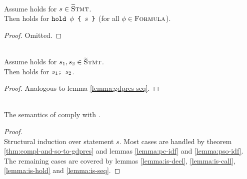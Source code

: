 \begin{lemma}
    \label{lemma:is-hold}~\\
    Assume  holds for $s \in \textup{\textsc{\ensuremath{\widetilde{\text{S}}}tmt}}$.\\
    Then  holds for $\textup{\texttt{hold $\phi$~\{ $s$ \}}}$ (for all $\phi \in \textup{\textsc{Formula}}$).
\end{lemma}
\begin{proof}
    Omitted.
\end{proof}

\begin{lemma}
    \label{lemma:is-seq}~\\
    Assume  holds for $s_1, s_2 \in \textup{\textsc{\ensuremath{\widetilde{\text{S}}}tmt}}$.\\
    Then  holds for $\textup{\texttt{{$s_1$};~{$s_2$}}}$.
\end{lemma}
\begin{proof}
    Analogous to lemma \ref{lemma:gdpres-seq}.
\end{proof}

\begin{theorem}~\\
    The semantics of \gvlidf comply with .
\end{theorem}
\begin{proof}~\\
    Structural induction over statement $s$.
    Most cases are handled by theorem \ref{thm:compl-and-so-to-gdpres} and lemmas \ref{lemma:pc-idf} and \ref{lemma:pso-idf}.
    The remaining cases are covered by lemmas 
    \ref{lemma:is-decl},
    \ref{lemma:is-call},
    \ref{lemma:is-hold} and
    \ref{lemma:is-seq}.
\end{proof}
